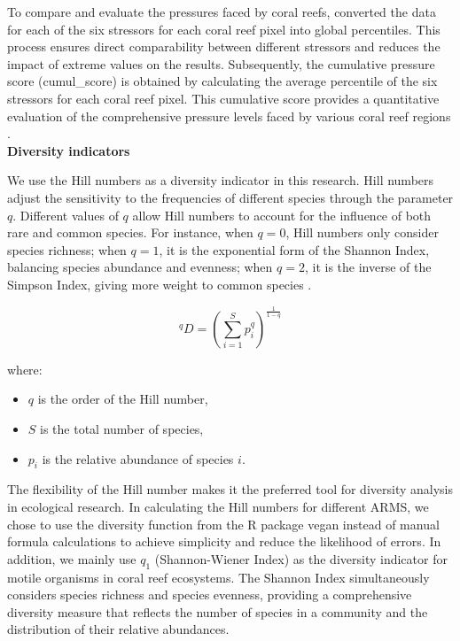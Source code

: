 \documentclass[a4paper, 11]{article}
\begin{document}
To compare and evaluate the pressures faced by coral reefs, \citet{andrello2022global} converted the data for each of the six stressors for each coral reef pixel into global percentiles. This process ensures direct comparability between different stressors and reduces the impact of extreme values on the results. Subsequently, the cumulative pressure score (cumul\_score) is obtained by calculating the average percentile of the six stressors for each coral reef pixel. This cumulative score provides a quantitative evaluation of the comprehensive pressure levels faced by various coral reef regions \citep{andrello2022global}.\\


\noindent\textbf{Diversity indicators}

We use the Hill numbers as a diversity indicator in this research. Hill numbers adjust the sensitivity to the frequencies of different species through the parameter \( q \). Different values of \( q \) allow Hill numbers to account for the influence of both rare and common species. For instance, when \( q = 0 \), Hill numbers only consider species richness; when \( q = 1 \), it is the exponential form of the Shannon Index, balancing species abundance and evenness; when \( q = 2 \), it is the inverse of the Simpson Index, giving more weight to common species \cite{jost2006entropy}.

\begin{equation}
    {^q}D = \left( \sum_{i=1}^{S} p_i^q \right)^{\frac{1}{1-q}}
\end{equation}

where:
\begin{itemize}
    \item $q$ is the order of the Hill number,
    \item $S$ is the total number of species,
    \item $p_i$ is the relative abundance of species $i$.
\end{itemize}

The flexibility of the Hill number makes it the preferred tool for diversity analysis in ecological research. In calculating the Hill numbers for different ARMS, we chose to use the diversity function from the R package vegan instead of manual formula calculations to achieve simplicity and reduce the likelihood of errors. In addition, we mainly use \(q_1\) (Shannon-Wiener Index) as the diversity indicator for motile organisms in coral reef ecosystems. The Shannon Index simultaneously considers species richness and species evenness, providing a comprehensive diversity measure that reflects the number of species in a community and the distribution of their relative abundances.
\end{document}
